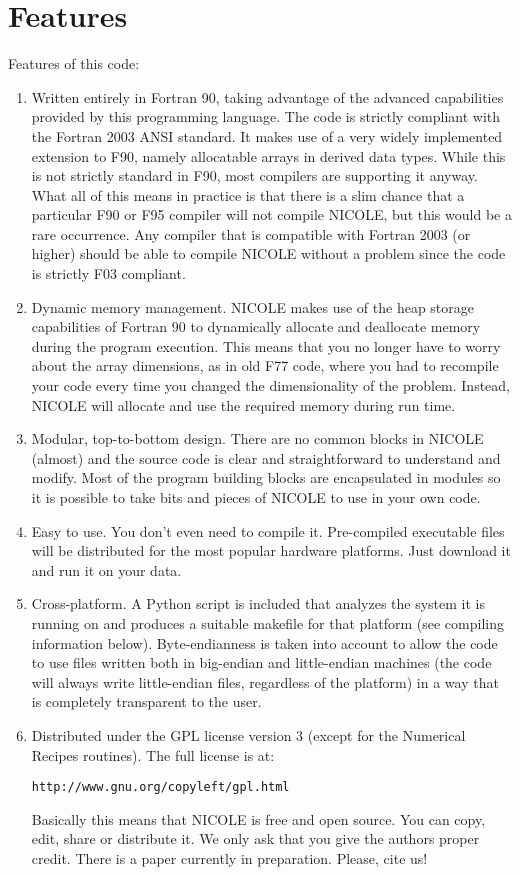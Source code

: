\section{Features}
Features of this code:
\begin{enumerate}
\item Written entirely in Fortran 90, taking advantage of
  the advanced capabilities provided by this programming language. The
  code is strictly compliant with the Fortran 2003 ANSI standard. It
  makes use of a very widely implemented extension to F90, namely
  allocatable arrays in derived data types. While this is not strictly
  standard in F90, most compilers are supporting it anyway. What all
  of this means in practice is that there is a slim chance that a
  particular F90 or F95 compiler will not compile NICOLE, but this
  would be a rare occurrence. Any compiler that is compatible with
  Fortran 2003 (or higher) should be able to compile NICOLE without a
  problem since the code is strictly F03 compliant.
\item Dynamic memory management. NICOLE makes use of the heap storage
  capabilities of Fortran 90 to dynamically allocate and deallocate
  memory during the program execution. This means that you no longer
  have to worry about the array dimensions, as in old F77 code, where
  you had to recompile your code every time you changed the
  dimensionality of the problem.  Instead, NICOLE will allocate and
  use the required memory during run time.
\item Modular, top-to-bottom design. There are no common blocks in
  NICOLE (almost) and the source code is clear and straightforward to
  understand and modify. Most of the program building blocks are
  encapsulated in modules so it is possible to take bits and pieces of
  NICOLE to use in your own code.
\item Easy to use. You don't even need to compile it.  Pre-compiled
  executable files will be distributed for the most popular hardware
  platforms.  Just download it and run it on your data.
\item Cross-platform. A Python script is included that analyzes the
  system it is running on and produces a suitable makefile for that
  platform (see compiling information below). Byte-endianness is taken
  into account to allow the code to use files written both in
  big-endian and little-endian machines (the code will always write
  little-endian files, regardless of the platform) in a way that is
  completely transparent to the user.
\item Distributed under the GPL license version 3 (except for the
  Numerical Recipes routines). The full license is at:
\begin{verbatim}
http://www.gnu.org/copyleft/gpl.html
\end{verbatim}
Basically this means that NICOLE is free and open source. You can
copy, edit, share or distribute it. We only ask that you give the
authors proper credit. There is a paper currently in
preparation. Please, cite us!
\end{enumerate}

